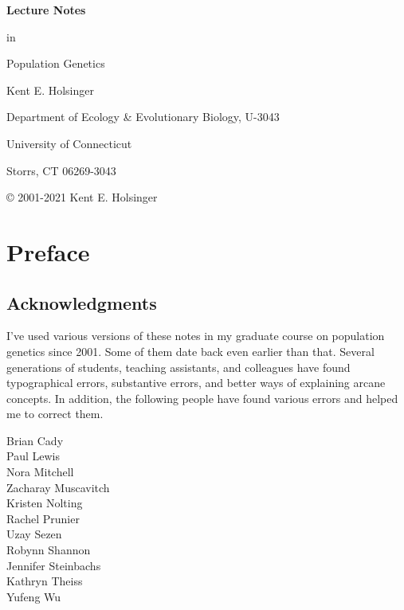 \documentclass[12pt,titlepage,openright]{book}
\begin{document}
\begin{titlepage}

{\Large\bf \noindent Lecture Notes

\noindent in

\noindent Population Genetics

}

\vfill

{\noindent Kent E. Holsinger

\noindent Department of Ecology \& Evolutionary Biology, U-3043

\noindent University of Connecticut

\noindent Storrs, CT  06269-3043}

\vfill

\end{titlepage}


{\small\noindent \copyright{} 2001-2021 Kent E. Holsinger

\ccLicense}

\tableofcontents

\chapter*{Preface}

\section*{Acknowledgments}

I've used various versions of these notes in my graduate course on
population genetics
since 2001. Some of them date back even earlier than that. Several
generations of students, teaching assistants, and colleagues have
found typographical errors, substantive errors, and better ways of
explaining arcane concepts. In addition, the following people have
found various errors and helped me to correct them.

\begin{multicols}{2}
  \noindent Brian Cady \\
  Paul Lewis \\
  Nora Mitchell \\
  Zacharay Muscavitch \\
  Kristen Nolting \\
  Rachel Prunier \\
  Uzay Sezen \\
  Robynn Shannon \\
  Jennifer Steinbachs \\
  Kathryn Theiss \\
  Yufeng Wu \\
\end{multicols}
\end{document}
